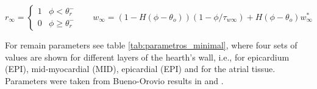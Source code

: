 \begin{equation}
r_{\infty} = \left\lbrace \begin{array}{cr}
1 & \phi < \theta_r^- \\
0 & \phi \geqslant \theta_r^-
\end{array} \right.
~~~~~~~~w_{\infty} = (1 - H(\phi - \theta_o))(1 - \phi/\tau_{w\infty}) + H(\phi - \theta_o)w_{\infty}^*
\end{equation}


For remain parameters see table \ref{tab:parametros_minimal}, where four sets of values are shown for different layers of the  hearth's wall, i.e., for epicardium (EPI), mid-myocardial (MID), epicardial (EPI) and for the atrial tissue. Parameters were taken from Bueno-Orovio results in \cite{BUENO_OROVIO_MINIMAL} and \cite{MINIMAL_ATRIAL}. 


